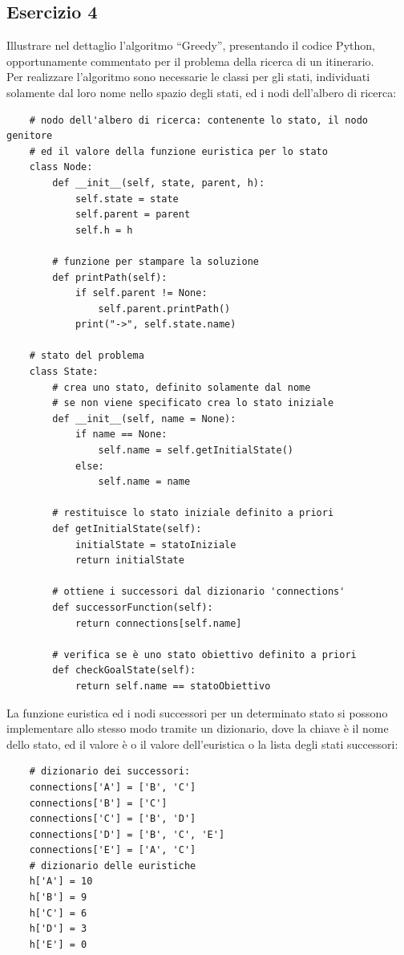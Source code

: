 \documentclass{article}
\numberwithin{equation}{section}
\begin{document}
\subsection{Esercizio 4}

Illustrare nel dettaglio l'algoritmo ``Greedy'', presentando il codice Python, opportunamente commentato per il problema della ricerca di un 
itinerario. \\
Per realizzare l'algoritmo sono necessarie le classi per gli stati, individuati solamente dal loro nome nello spazio degli stati, 
ed i nodi dell'albero di ricerca:
\begin{verbatim}
    # nodo dell'albero di ricerca: contenente lo stato, il nodo genitore
    # ed il valore della funzione euristica per lo stato
    class Node:
        def __init__(self, state, parent, h):
            self.state = state
            self.parent = parent
            self.h = h
        
        # funzione per stampare la soluzione
        def printPath(self):
            if self.parent != None:
                self.parent.printPath()
            print("->", self.state.name)
    
    # stato del problema
    class State:
        # crea uno stato, definito solamente dal nome
        # se non viene specificato crea lo stato iniziale
        def __init__(self, name = None):
            if name == None:
                self.name = self.getInitialState()
            else:
                self.name = name

        # restituisce lo stato iniziale definito a priori
        def getInitialState(self):
            initialState = statoIniziale
            return initialState

        # ottiene i successori dal dizionario 'connections'
        def successorFunction(self):
            return connections[self.name]

        # verifica se è uno stato obiettivo definito a priori
        def checkGoalState(self):
            return self.name == statoObiettivo
\end{verbatim}
La funzione euristica ed i nodi successori per un determinato stato si possono implementare 
allo stesso modo tramite un dizionario, dove la chiave è il nome dello stato, ed il valore 
è o il valore dell'euristica o la lista degli stati successori:
\begin{verbatim}
    # dizionario dei successori: 
    connections['A'] = ['B', 'C']
    connections['B'] = ['C']
    connections['C'] = ['B', 'D']
    connections['D'] = ['B', 'C', 'E']
    connections['E'] = ['A', 'C']
    # dizionario delle euristiche
    h['A'] = 10
    h['B'] = 9
    h['C'] = 6
    h['D'] = 3
    h['E'] = 0
\end{verbatim}
\end{document}

